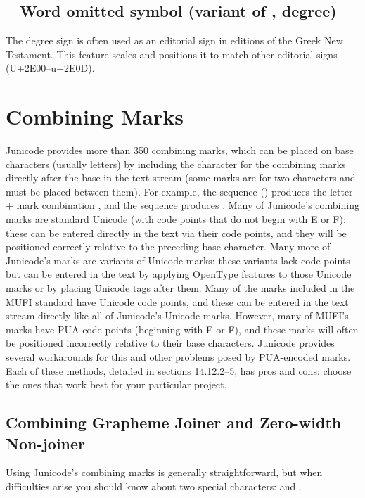\subsection{ – Word omitted symbol (variant of , degree)}
The degree sign is often used as an editorial sign in editions of the Greek New Testament. This feature
scales and positions it to match other editorial signs (U+2E00--u+2E0D).

\section{Combining Marks}

Junicode provides more than 350 combining marks, which can be placed on base characters (usually letters)
by including the character for the combining marks directly after the base in the text stream (some marks
are for two characters and must be placed between them). For example,
the sequence  () produces the letter + mark combination 
, and the sequence  produces
. Many of Junicode’s combining marks are standard Unicode (with code points that do not 
begin with E or F): these can be entered directly in the text via their code points, and they will be positioned correctly 
relative to the preceding base character. Many more of Junicode's marks are variants of Unicode 
marks: these variants lack code points but can be entered in the text by applying OpenType features to 
those Unicode marks or by placing Unicode tags after them. Many of the marks included in the MUFI 
standard have Unicode code points, and these can be entered in the text stream directly like all of Junicode’s 
Unicode marks. However, many
of MUFI's marks have PUA code points (beginning with E or F), and these marks will often be positioned
incorrectly relative to their base characters. Junicode provides several workarounds for this and other 
problems posed by PUA-encoded marks. Each of these methods, detailed in sections 14.12.2–5,
has pros and cons: choose the ones that work best for your particular project.

\subsection{Combining Grapheme Joiner and Zero-width Non-joiner}\hypertarget{cgj}{}

Using Junicode’s combining marks is generally straightforward, but when difficulties arise you should 
know about two special characters:   and 
.

